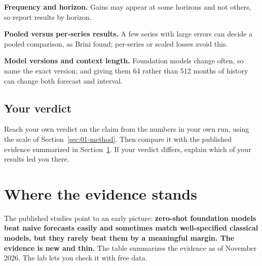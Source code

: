 \textbf{Frequency and horizon.} Gains may appear at some horizons and not others, so report results by horizon.

\textbf{Pooled versus per-series results.} A few series with large errors can decide a pooled comparison, as Brini found; per-series or scaled losses avoid this.

\textbf{Model versions and context length.} Foundation models change often, so name the exact version; and giving them 64 rather than 512 months of history can change both forecast and interval.

\subsection*{Your verdict}

Reach your own verdict on the claim from the numbers in your own run, using the scale of Section~\ref{sec:01-method}. Then compare it with the published evidence summarized in Section~\ref{sec:21-verdict}. If your verdict differs, explain which of your results led you there.

\section{Where the evidence stands}
\label{sec:21-verdict}

The published studies point to an early picture: \textbf{zero-shot foundation models beat naive forecasts easily and sometimes match well-specified classical models, but they rarely beat them by a meaningful margin. The evidence is new and thin.} The table summarizes the evidence as of November 2026. The lab lets you check it with free data.

